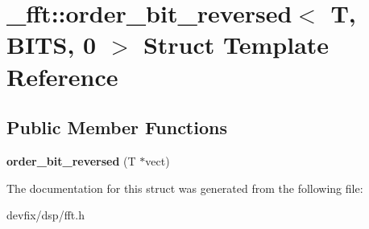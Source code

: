 \hypertarget{struct__fft_1_1order__bit__reversed_3_01T_00_01BITS_00_010_01_4}{}\section{\+\_\+fft\+:\+:order\+\_\+bit\+\_\+reversed$<$ T, B\+I\+TS, 0 $>$ Struct Template Reference}
\label{struct__fft_1_1order__bit__reversed_3_01T_00_01BITS_00_010_01_4}
\subsection*{Public Member Functions}
\begin{DoxyCompactItemize}
\item 
\mbox{\label{struct__fft_1_1order__bit__reversed_3_01T_00_01BITS_00_010_01_4_ab0f5b7ab6b450f7b5125bab7aa18d7a3}} 
{\bfseries order\+\_\+bit\+\_\+reversed} (T $\ast$vect)
\end{DoxyCompactItemize}


The documentation for this struct was generated from the following file\+:\begin{DoxyCompactItemize}
\item 
devfix/dsp/fft.\+h\end{DoxyCompactItemize}
